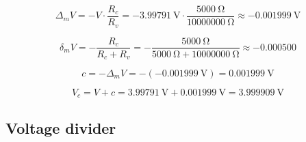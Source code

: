 \begin{equation}
	\Delta_m V = -V\cdot\frac{R_c}{R_v} = -\SI{3.99791}{\volt}\cdot\frac{\SI{5000}{\ohm}}{\SI{10000000}{\ohm}} \approx -\SI{0.001999}{\volt}
	\label{eq:digital_Delta_m}
\end{equation}

\begin{equation}
	\delta_m V = -\frac{R_c}{R_c + R_v} = -\frac{\SI{5000}{\ohm}}{\SI{5000}{\ohm} + \SI{10000000}{\ohm}} \approx -0.000500
	\label{eq:digital_delta_m}
\end{equation}

\begin{equation}
	c = -\Delta_m V = -(-\SI{0.001999}{\volt}) = \SI{0.001999}{\volt}
	\label{eq:digital_c}
\end{equation}

\begin{equation}
	V_c = V + c = \SI{3.99791}{\volt} + \SI{0.001999}{\volt} = \SI{3.999909}{\volt}
	\label{eq:digital_V_c}
\end{equation}


\subsection{Voltage divider}